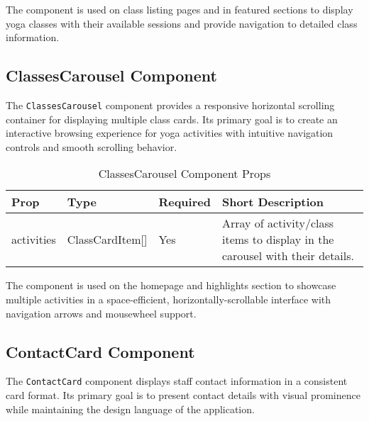 The component is used on class listing pages and in featured sections to display yoga classes with their available sessions and provide navigation to detailed class information.

\subsection{ClassesCarousel Component}
The \texttt{ClassesCarousel} component provides a responsive horizontal scrolling container for displaying multiple class cards. Its primary goal is to create an interactive browsing experience for yoga activities with intuitive navigation controls and smooth scrolling behavior.

\begin{table}[H]
    \centering
    \setlength{\tabcolsep}{5pt}
    \renewcommand{\arraystretch}{1.2}
    \begin{tabular}{|p{2.2cm}|p{3.6cm}|p{1.5cm}|p{6cm}|}
        \hline
        \rowcolor{bluepoli!20}
        \textbf{Prop} & \textbf{Type} & \textbf{Required} & \textbf{Short Description} \\
        \hline
        activities & ClassCardItem[] & Yes & Array of activity/class items to display in the carousel with their details. \\
        \hline
    \end{tabular}
    \caption{ClassesCarousel Component Props}
\end{table}

The component is used on the homepage and highlights section to showcase multiple activities in a space-efficient, horizontally-scrollable interface with navigation arrows and mousewheel support.

\subsection{ContactCard Component}
The \texttt{ContactCard} component displays staff contact information in a consistent card format. Its primary goal is to present contact details with visual prominence while maintaining the design language of the application.


